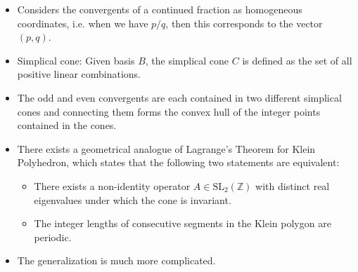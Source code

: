 \begin{itemize}
  \item Considers the convergents of a continued fraction as homogeneous coordinates,
    i.e. when we have $p / q$, then this corresponds to the vector $(p, q)$.
  \item Simplical cone: Given basis $B$, the simplical cone $C$ is defined as
    the set of all positive linear combinations.
  \item
    The odd and even convergents are each contained in two different simplical cones
    and connecting them forms the convex hull of the integer points contained in the cones.
  \item
    There exists a geometrical analogue of Lagrange's Theorem for Klein Polyhedron,
    which states that the following two statements are equivalent:
    \begin{itemize}
      \item
        There exists a non-identity operator $A ∈ \mathrm{SL}_2(ℤ)$ with
        distinct real eigenvalues under which the cone is invariant.
      \item
        The integer lengths of consecutive segments in the Klein polygon are periodic.
    \end{itemize}
  \item The generalization is much more complicated.
\end{itemize}
